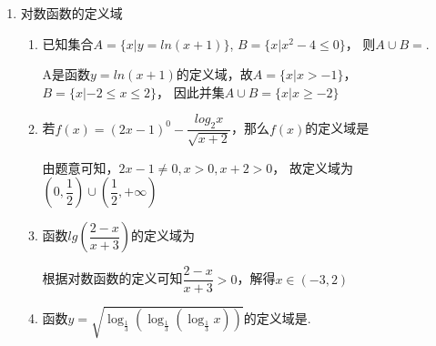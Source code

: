 \begin{enumerate}
\begin{enumerate}
\begin{jieda}
\begin{enumerate}[(1)]
                \item $x + 2y = x + \dfrac{2x}{x-1} = (x-1) + \dfrac{2}{x-1}+3 \geq 2\sqrt{2} + 3$，在$x = 1+\sqrt{2}, y = 1 + \dfrac{\sqrt{2}}{2}$时取等号.
                \item $\dfrac{4x}{x-1} + \dfrac{9y}{y-1} = \dfrac{4x}{x-1} + 9x = 9(x-1) + \dfrac{4}{x-1}+13 \geq 25$，在$x = \dfrac{5}{3}, y = \dfrac{5}{2}$时取等号.
                \item $\dfrac{1}{z} = 1 - \dfrac{1}{x+y} = 1 - \dfrac{x-1}{x^2} = 1 - \dfrac{1}{x} + \dfrac{1}{x^2}$\\
                令$t = \dfrac{1}{x}, t \in (0, 1)$，因此$\dfrac{1}{z} \in [\dfrac{3}{4}, 1)$，故$z \in (1, \dfrac{4}{3}]$
            \end{enumerate}
        \end{jieda}
    \end{enumerate}
    \item 对数函数的定义域
    \begin{enumerate}
        \item 已知集合$A = \{x | y = ln(x+1)\}$, $B = \{x | x^2 - 4 \leq 0\}$， 则$A \cup B = $. 
        \begin{jieda}
            A是函数$y = ln(x+1)$的定义域，故$A=\{x|x>-1\}$，$B = \{x|-2 \leq x \leq 2\}$， 因此并集$A \cup B = \{x | x \geq -2\}$
        \end{jieda}
        \item 若$f(x) = (2x-1)^0 - \dfrac{log_2x}{\sqrt{x+2}}$，那么$f(x)$的定义域是
        \begin{jieda}
            由题意可知，$2x-1 \neq 0, x > 0, x+2 > 0$， 故定义域为$(0, \dfrac{1}{2}) \cup (\dfrac{1}{2}, +\infty)$
        \end{jieda}
        \item 函数$lg\left(\dfrac{2-x}{x+3}\right)$的定义域为
        \begin{jieda}
            根据对数函数的定义可知$\dfrac{2-x}{x+3} > 0$，解得$x \in (-3, 2)$
        \end{jieda}
        \item 函数$y=\sqrt{\log_{\frac{1}{3}}\left(\log_{\frac{1}{3}}\left(\log_{\frac{1}{3}}x\right)\right)}$的定义域是\blkda{$\left(\dfrac{1}{3},\sqrt[3]{\dfrac{1}{3}}\right]$}.
\end{enumerate}
\end{enumerate}
